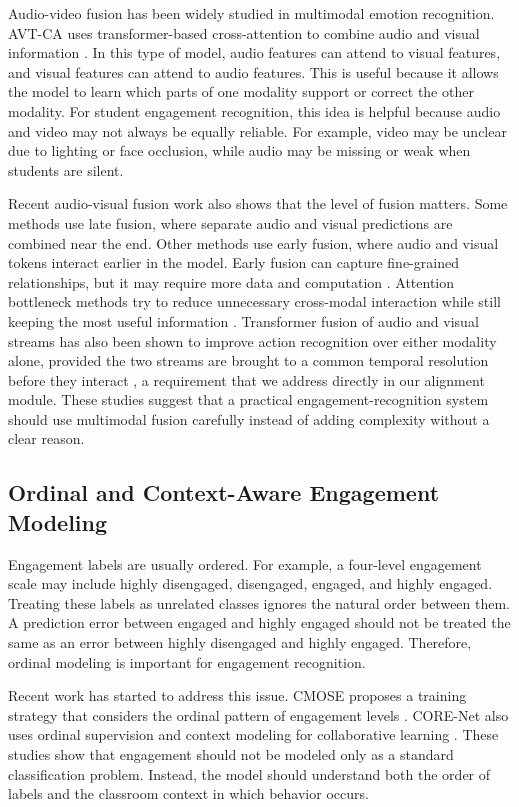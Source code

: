 \documentclass[journal]{IEEEtran}
\begin{document}
Audio-video fusion has been widely studied in multimodal emotion recognition. AVT-CA uses transformer-based cross-attention to combine audio and visual information \cite{venkatraman2025avtca}. In this type of model, audio features can attend to visual features, and visual features can attend to audio features. This is useful because it allows the model to learn which parts of one modality support or correct the other modality. For student engagement recognition, this idea is helpful because audio and video may not always be equally reliable. For example, video may be unclear due to lighting or face occlusion, while audio may be missing or weak when students are silent.

Recent audio-visual fusion work also shows that the level of fusion matters. Some methods use late fusion, where separate audio and visual predictions are combined near the end. Other methods use early fusion, where audio and visual tokens interact earlier in the model. Early fusion can capture fine-grained relationships, but it may require more data and computation \cite{mo2024earlyfusion}. Attention bottleneck methods try to reduce unnecessary cross-modal interaction while still keeping the most useful information \cite{nagrani2021attention}. Transformer fusion of audio and visual streams has also been shown to improve action recognition over either modality alone, provided the two streams are brought to a common temporal resolution before they interact \cite{kim2024avaction}, a requirement that we address directly in our alignment module. These studies suggest that a practical engagement-recognition system should use multimodal fusion carefully instead of adding complexity without a clear reason.

\subsection{Ordinal and Context-Aware Engagement Modeling}

Engagement labels are usually ordered. For example, a four-level engagement scale may include highly disengaged, disengaged, engaged, and highly engaged. Treating these labels as unrelated classes ignores the natural order between them. A prediction error between engaged and highly engaged should not be treated the same as an error between highly disengaged and highly engaged. Therefore, ordinal modeling is important for engagement recognition.

Recent work has started to address this issue. CMOSE proposes a training strategy that considers the ordinal pattern of engagement levels \cite{wu2024cmose}. CORE-Net also uses ordinal supervision and context modeling for collaborative learning \cite{tran2026ordinal}. These studies show that engagement should not be modeled only as a standard classification problem. Instead, the model should understand both the order of labels and the classroom context in which behavior occurs.
\end{document}
